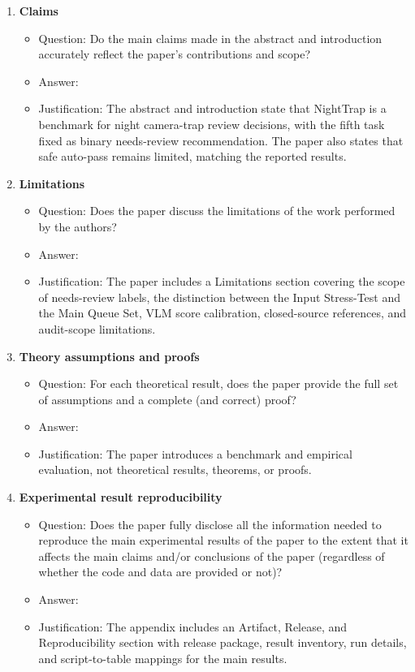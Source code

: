 \begin{enumerate}

\item {\bf Claims}
\begin{itemize}
    \item[] Question: Do the main claims made in the abstract and introduction accurately reflect the paper's contributions and scope?
    \item[] Answer: \answerYes{}
    \item[] Justification: The abstract and introduction state that NightTrap is a benchmark for night camera-trap review decisions, with the fifth task fixed as binary needs-review recommendation. The paper also states that safe auto-pass remains limited, matching the reported results.
\end{itemize}

\item {\bf Limitations}
\begin{itemize}
    \item[] Question: Does the paper discuss the limitations of the work performed by the authors?
    \item[] Answer: \answerYes{}
    \item[] Justification: The paper includes a Limitations section covering the scope of needs-review labels, the distinction between the Input Stress-Test and the Main Queue Set, VLM score calibration, closed-source references, and audit-scope limitations.
\end{itemize}

\item {\bf Theory assumptions and proofs}
\begin{itemize}
    \item[] Question: For each theoretical result, does the paper provide the full set of assumptions and a complete (and correct) proof?
    \item[] Answer: \answerNA{}
    \item[] Justification: The paper introduces a benchmark and empirical evaluation, not theoretical results, theorems, or proofs.
\end{itemize}

\item {\bf Experimental result reproducibility}
\begin{itemize}
    \item[] Question: Does the paper fully disclose all the information needed to reproduce the main experimental results of the paper to the extent that it affects the main claims and/or conclusions of the paper (regardless of whether the code and data are provided or not)?
    \item[] Answer: \answerYes{}
    \item[] Justification: The appendix includes an Artifact, Release, and Reproducibility section with release package, result inventory, run details, and script-to-table mappings for the main results.
\end{itemize}


\end{enumerate}
